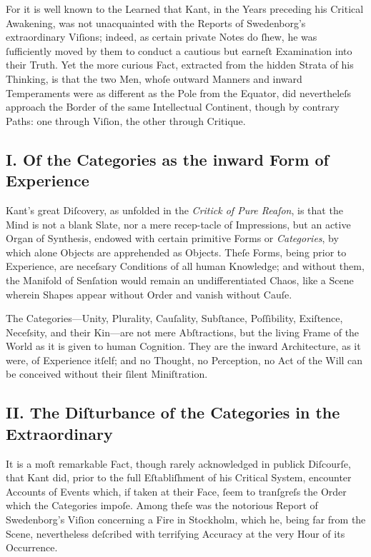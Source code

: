 \documentclass[12pt]{article}
\begin{document}
For it is well known to the Learned that Kant, in the Years preceding his 
Critical Awakening, was not unacquainted with the Reports of Swedenborg’s 
extraordinary Viſions; indeed, as certain private Notes do ſhew, he was 
ſufficiently moved by them to conduct a cautious but earneſt Examination into 
their Truth. Yet the more curious Fact, extracted from the hidden Strata of his 
Thinking, is that the two Men, whoſe outward Manners and inward Temperaments 
were as different as the Pole from the Equator, did nevertheleſs approach the 
Border of the same Intellectual Continent, though by contrary Paths: one 
through Viſion, the other through Critique.

\subsection*{I. Of the Categories as the inward Form of Experience}

Kant’s great Diſcovery, as unfolded in the \textit{Critick of Pure Reaſon}, is 
that the Mind is not a blank Slate, nor a mere recep-tacle of Impressions, but 
an active Organ of Synthesis, endowed with certain primitive Forms or 
\textit{Categories}, by which alone Objects are apprehended as Objects. Theſe 
Forms, being prior to Experience, are neceſsary Conditions of all human 
Knowledge; and without them, the Manifold of Senſation would remain an 
undifferentiated Chaos, like a Scene wherein Shapes appear without Order and 
vanish without Cauſe.

The Categories—Unity, Plurality, Cauſality, Subſtance, Poſſibility, Exiſtence, 
Neceſsity, and their Kin—are not mere Abſtractions, but the living Frame of 
the World as it is given to human Cognition. They are the inward 
Architecture, as it were, of Experience itſelf; and no Thought, no Perception, 
no Act of the Will can be conceived without their ſilent Miniſtration.

\subsection*{II. The Diſturbance of the Categories in the Extraordinary}

It is a moſt remarkable Fact, though rarely acknowledged in publick Diſcourſe, 
that Kant did, prior to the full Eſtabliſhment of his Critical System, 
encounter Accounts of Events which, if taken at their Face, ſeem to tranſgreſs 
the Order which the Categories impoſe. Among theſe was the notorious Report of 
Swedenborg’s Viſion concerning a Fire in Stockholm, which he, being far from 
the Scene, nevertheless deſcribed with terrifying Accuracy at the very Hour of 
its Occurrence.
\end{document}
